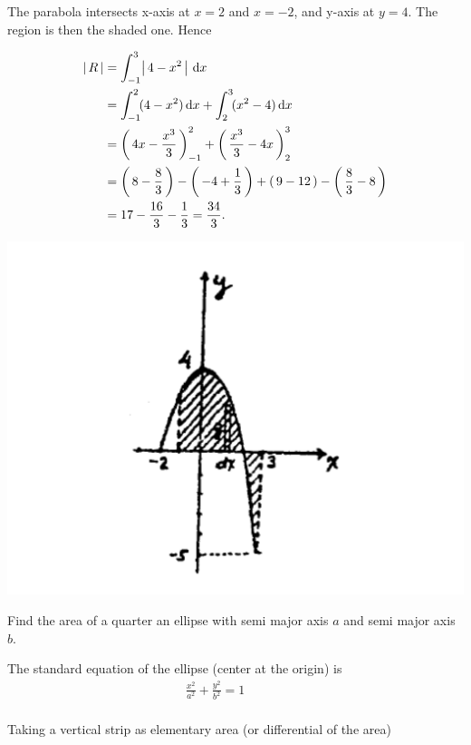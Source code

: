 \documentclass{book}
\begin{document}
	\begin{hSolution}
	The parabola intersects x-axis at $x=2$ and $x=-2$, and y-axis at $y=4$. The region is then the shaded one. Hence 
	
	\noindent\begin{minipage}{0.55\textwidth}
	\begin{align*}
		\left \lvert \, R \, \right \rvert
		&= \int_{-1}^{3} \! \left \lvert \, 4-x^{2} \, \right \rvert \, \mathrm{d} x\\
		 &= \int_{-1}^{2} \! (4-x^{2}) \, \mathrm{d} x + \int_{2}^{3} \! (x^{2}-4) \, \mathrm{d} x\\
		&=  \left( \, 4x-\frac{x^{3}}{3} \, \right) _{-1}^{2} +  \left( \, \frac{x^{3}}{3}-4x \, \right) _{2}^{3}\\
		&=  \left( \, 8-\frac{8}{3} \, \right)  -  \left( \, -4+\frac{1}{3} \, \right)  +  \left( \, 9-12 \, \right)  -  \left( \, \frac{8}{3}-8 \, \right)  \\
		&= 17-\frac{16}{3}-\frac{1}{3} = \frac{34}{3}.
	\end{align*}
	\end{minipage}
	\begin{minipage}{0.45\textwidth}
		\includegraphics[width=\textwidth]{images/img1}
	\end{minipage}
	
	\end{hSolution}
	\begin{exmp}
		Find the area of a quarter an ellipse with semi major axis $a$ and semi major axis $b$.
	\end{exmp}
		\begin{hSolution}
			The standard equation of the ellipse (center at the origin) is 
			\begin{align*}
				\frac{x^{2}}{a^{2}}+\frac{y^{2}}{b^{2}}=1 && &&
			\end{align*}
			\paragraph{}Taking a vertical strip as elementary area (or differential of the area)
		\end{hSolution}
\end{document}
